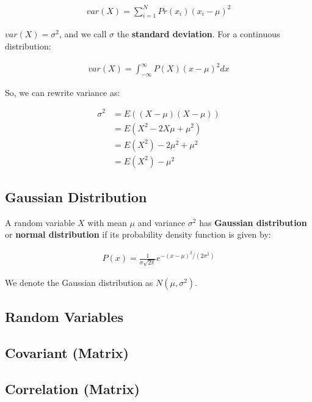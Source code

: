 \documentclass[11pt]{article}
\begin{document}
\begin{align*}
    var\left( X \right) = \sum_{i=1}^{N} Pr\left( x_{i} \right)\left( x_{i} - \mu \right)^{2}
\end{align*}

\(var\left( X \right) = \sigma^{2}\), and we call \(\sigma\) the \textbf{standard deviation}. For a continuous distribution:

\begin{align*}
    var\left( X \right) = \int_{-\infty}^{\infty} P\left( X \right)\left( x - \mu \right)^{2}dx
\end{align*}

So, we can rewrite variance as:

\begin{align*}
    \sigma^{2} &= E\left(\left( X - \mu \right)\left( X - \mu \right)\right) \\
    &= E\left( X^{2} - 2X\mu + \mu^{2} \right) \\
    &= E\left( X^{2} \right) - 2\mu^{2} + \mu^{2} \\
    &= E\left( X^{2} \right) - \mu^{2}
\end{align*}

\subsection{Gaussian Distribution}
\label{sec:orgc04b63a}
A random variable \(X\) with mean \(\mu\) and variance \(\sigma^{2}\) has \textbf{Gaussian distribution} or \textbf{normal distribution} if its probability density function is given by:

\begin{align*}
    P\left( x \right) = \frac{1}{\sigma\sqrt{2\pi}}e^{-\left( x - \mu \right)^{2}/\left(2\sigma^{2}\right)}
\end{align*}

We denote the Gaussian distribution as \(N\left( \mu,\sigma^{2} \right)\).

\subsection{Random Variables}
\label{sec:org3b16f3d}
\subsection{Covariant (Matrix)}
\label{sec:org7595bff}
\subsection{Correlation (Matrix)}
\label{sec:org52b25e5}
\end{document}
